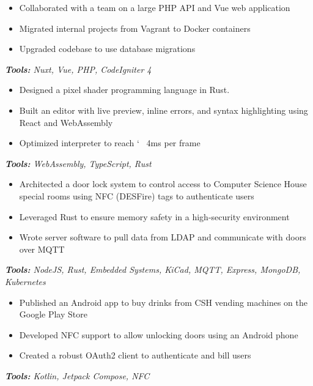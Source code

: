 \documentclass[10pt,letter]{altacv}
\begin{document}
\divider

\begin{itemize}
  \item Collaborated with a team on a large PHP API and Vue web application
  \item Migrated internal projects from Vagrant to Docker containers
  \item Upgraded codebase to use database migrations
\end{itemize}
\textit{\textbf{Tools:} Nuxt, Vue, PHP, CodeIgniter 4}

\smallskip


\smallskip

\begin{itemize}
\item Designed a pixel shader programming language in Rust.
\item Built an editor with live preview, inline errors, and syntax highlighting using React and WebAssembly
\item Optimized interpreter to reach \char `~ 4ms per frame
\end{itemize}
\textit{\textbf{Tools:} WebAssembly, TypeScript, Rust}

\divider
  
\begin{itemize}
\item Architected a door lock system to control access to Computer Science House special rooms using NFC (DESFire) tags to authenticate users
\item Leveraged Rust to ensure memory safety in a high-security environment
\item Wrote server software to pull data from LDAP and communicate with doors over MQTT
\end{itemize}
\textit{\textbf{Tools:} NodeJS, Rust, Embedded Systems, KiCad, MQTT, Express, MongoDB, Kubernetes}

\divider

\begin{itemize}
\item Published an Android app to buy drinks from CSH vending machines on the Google Play Store
\item Developed NFC support to allow unlocking doors using an Android phone
\item Created a robust OAuth2 client to authenticate and bill users
\end{itemize}
\textit{\textbf{Tools:} Kotlin, Jetpack Compose, NFC}

\clearpage
\end{document}
